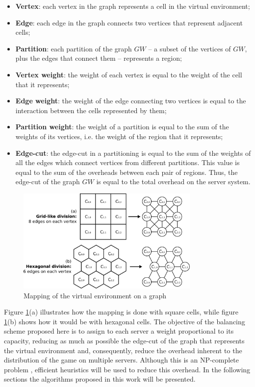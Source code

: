\begin{itemize}
	\item \textbf{Vertex}: each vertex in the graph represents a cell in the virtual environment;
	\item \textbf{Edge}: each edge in the graph connects two vertices that represent adjacent cells;
	\item \textbf{Partition}: each partition of the graph $GW$ -- a subset of the vertices of $GW$, plus the edges that connect them -- represents a region;
	\item \textbf{Vertex weight}: the weight of each vertex is equal to the weight of the cell that it represents;
	\item \textbf{Edge weight}: the weight of the edge connecting two vertices is equal to the interaction between the cells represented by them;
	\item \textbf{Partition weight}: the weight of a partition is equal to the sum of the weights of its vertices, i.e. the weight of the region that it represents;
	\item \textbf{Edge-cut}: the edge-cut in a partitioning is equal to the sum of the weights of all the edges which connect vertices from different partitions. This value is equal to the sum of the overheads between each pair of regions. Thus, the edge-cut of the graph $GW$ is equal to the total overhead on the server system.
\end{itemize}

\begin{figure}
	\centering
	\includegraphics[width=0.8\textwidth]{images/mapping}
	\caption{Mapping of the virtual environment on a graph}
	\label{fig:mapping}
\end{figure}

Figure \ref{fig:mapping}(a) illustrates how the mapping is done with square cells, while figure \ref{fig:mapping}(b) shows how it would be with hexagonal cells. The objective of the balancing scheme proposed here is to assign to each server a weight proportional to its capacity, reducing as much as possible the edge-cut of the graph that represents the virtual environment and, consequently, reduce the overhead inherent to the distribution of the game on multiple servers. Although this is an NP-complete problem \cite{feder1999cgp}, efficient heuristics will be used to reduce this overhead. In the following sections the algorithms proposed in this work will be presented.

